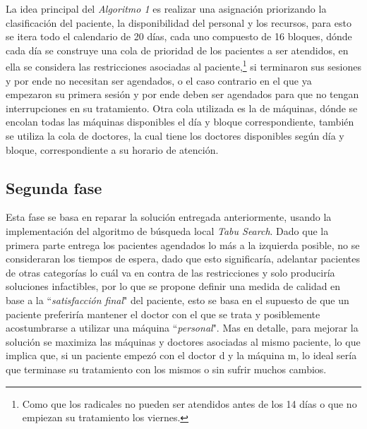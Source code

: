 \documentclass[letter, 10pt]{article}
\begin{document}
La idea principal del \textit{Algoritmo 1} es realizar una asignación priorizando la clasificación del paciente, la disponibilidad del personal y los recursos, para esto se itera todo el calendario de 20 días, cada uno compuesto de 16 bloques, dónde cada día se construye una cola de prioridad de los pacientes a ser atendidos, en ella se considera las restricciones asociadas al paciente,\footnote{Como que los radicales no pueden ser atendidos antes de los 14 días o que no empiezan su tratamiento los viernes.} si terminaron sus sesiones y por ende no necesitan ser agendados, o el caso contrario en el que ya empezaron su primera sesión y por ende deben ser agendados para que no tengan interrupciones en su tratamiento. Otra cola utilizada es la de máquinas, dónde se encolan todas las máquinas disponibles el día y bloque correspondiente, también se utiliza la cola de doctores, la cual tiene los doctores disponibles según día y bloque, correspondiente a su horario de atención. 

\subsection{Segunda fase}
    Esta fase se basa en reparar la solución entregada anteriormente, usando la implementación del algoritmo de búsqueda local \textit{Tabu Search}. Dado que la primera parte entrega los pacientes agendados lo más a la izquierda posible, no se consideraran los tiempos de espera, dado que esto significaría, adelantar pacientes de otras categorías lo cuál va en contra de las restricciones y solo produciría soluciones infactibles, por lo que se propone definir una medida de calidad en base a la ``\textit{satisfacción final}" del paciente, esto se basa en el supuesto de que un paciente preferiría mantener el doctor con el que se trata y posiblemente acostumbrarse a utilizar una máquina ``\textit{personal}". Mas en detalle, para mejorar la solución se maximiza las máquinas y doctores asociadas al mismo paciente, lo que implica que, si un paciente empezó con el doctor d y la máquina m, lo ideal sería que terminase su tratamiento con los mismos o sin sufrir muchos cambios.
\end{document}
